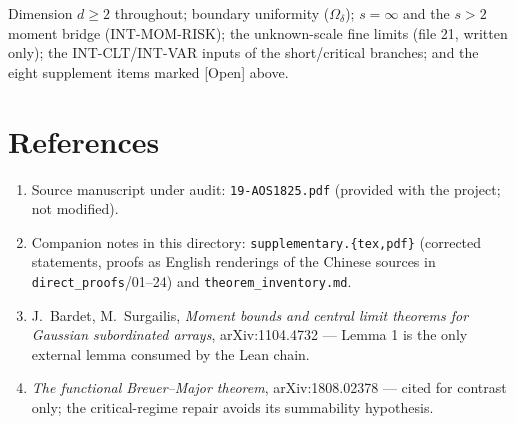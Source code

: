 \documentclass[11pt]{article}
\theoremstyle{definition}
\theoremstyle{remark}
\begin{document}
Dimension $d\ge2$ throughout; boundary uniformity ($\Omega_\delta$); $s=\infty$
and the $s>2$ moment bridge (INT-MOM-RISK); the unknown-scale fine limits
(file 21, written only); the INT-CLT/INT-VAR inputs of the short/critical
branches; and the eight supplement items marked [Open] above.

\section*{References}
\begin{enumerate}
\itemsep2pt
\item Source manuscript under audit: \texttt{19-AOS1825.pdf} (provided with
the project; not modified).
\item Companion notes in this directory: \texttt{supplementary.\{tex,pdf\}}
(corrected statements, proofs as English renderings of the Chinese sources
in \texttt{direct\_proofs}/01--24) and \texttt{theorem\_inventory.md}.
\item J.\ Bardet, M.\ Surgailis, \emph{Moment bounds and central limit
theorems for Gaussian subordinated arrays}, arXiv:1104.4732 --- Lemma 1 is
the only external lemma consumed by the Lean chain.
\item \emph{The functional Breuer--Major theorem}, arXiv:1808.02378 ---
cited for contrast only; the critical-regime repair avoids its summability
hypothesis.
\end{enumerate}
\end{document}
